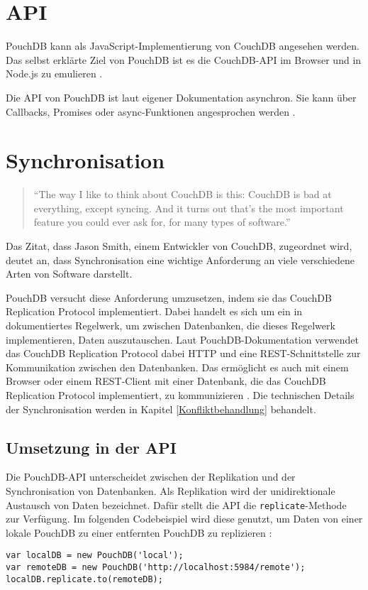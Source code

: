 \section{API}
\label{API}
PouchDB kann als JavaScript-Implementierung von CouchDB angesehen werden. Das selbst erklärte Ziel von PouchDB ist es die CouchDB-API im Browser und in Node.js zu emulieren \cite{pouch:intro}. 

Die API von PouchDB ist laut eigener Dokumentation asynchron. Sie kann über Callbacks, Promises oder async-Funktionen angesprochen werden \cite{pouch:api}.


\section{Synchronisation}
\label{Synchronisation}
\begin{citeenv}
\begin{quotation}
"`The way I like to think about CouchDB is this: CouchDB is bad at everything, except syncing. And it turns out that's the most important feature you could ever ask for, for many types of software."' \cite{pouch:replication}
\end{quotation}
\end{citeenv}

Das Zitat, dass Jason Smith, einem Entwickler von CouchDB, zugeordnet wird, deutet an, dass Synchronisation eine wichtige Anforderung an viele verschiedene Arten von Software darstellt.

PouchDB versucht diese Anforderung umzusetzen, indem sie das CouchDB Replication Protocol implementiert. Dabei handelt es sich um ein in \cite{apache:replication} dokumentiertes Regelwerk, um zwischen Datenbanken, die dieses Regelwerk implementieren, Daten auszutauschen. Laut PouchDB-Dokumentation verwendet das CouchDB Replication Protocol dabei HTTP und eine REST-Schnittstelle zur Kommunikation zwischen den Datenbanken. Das ermöglicht es auch mit einem Browser oder einem REST-Client mit einer Datenbank, die das CouchDB Replication Protocol implementiert, zu kommunizieren \cite{pouch:intro}. Die technischen Details der Synchronisation werden in Kapitel \ref{Konfliktbehandlung} behandelt.


\subsection{Umsetzung in der API}
Die PouchDB-API unterscheidet zwischen der Replikation und der Synchronisation von Datenbanken. Als Replikation wird der unidirektionale Austausch von Daten bezeichnet. Dafür stellt die API die \texttt{replicate}-Methode zur Verfügung. Im folgenden Codebeispiel wird diese genutzt, um Daten von einer lokale PouchDB zu einer entfernten PouchDB zu replizieren \cite{pouch:replication}:
\begin{codebox}
\begin{lstlisting}[style=typescript]
var localDB = new PouchDB('local');
var remoteDB = new PouchDB('http://localhost:5984/remote');
localDB.replicate.to(remoteDB);
\end{lstlisting}
\end{codebox}


